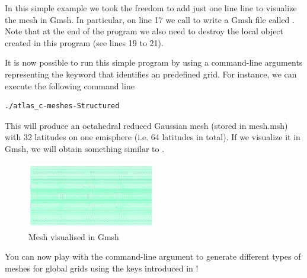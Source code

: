 In this simple example we took the freedom to add just one line 
line to visualize the mesh in Gmsh. In particular, on line 17 
we call  to write a Gmsh file called 
. Note that at the end of the program we also 
need to destroy the local object created in this program (see 
lines 19 to 21).

It is now possible to run this simple program by using 
a command-line arguments representing the keyword that 
identifies an \Atlas predefined grid. For instance, 
we can execute the following command line
%
\begin{lstlisting}[style=BashStyle]
./atlas_c-meshes-Structured
\end{lstlisting}
% 
This will produce an octahedral reduced Gaussian mesh 
(stored in mesh.msh) with 32 latitudes on one emisphere 
(i.e. 64 latitudes in total).
If we visualize it in Gmsh, we will obtain something similar
to .
%
\begin{figure}%
\centering
\includegraphics[width=0.5\textwidth]{imgs/O32-2D.png}
\caption{Mesh visualised in Gmsh}%
\label{fig:meshes-f}%
\end{figure}
%
You can now play with the command-line argument to generate 
different types of meshes for global grids using the keys 
introduced in !
